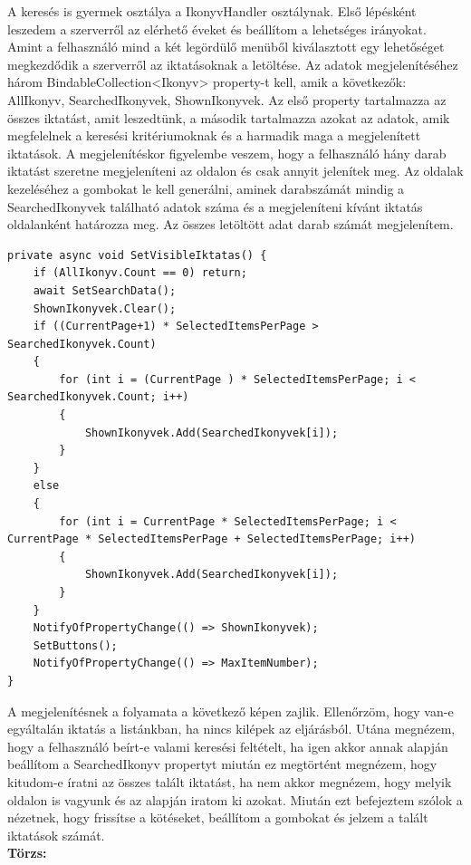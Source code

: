 \documentclass[
]{thesis-ekf}
\theoremstyle{definition}
\theoremstyle{remark}
\begin{document}
A keresés is gyermek osztálya a IkonyvHandler osztálynak. Első lépésként leszedem a szerverről az elérhető éveket és beállítom a lehetséges irányokat. Amint a felhasználó mind a két legördülő menüből kiválasztott egy lehetőséget megkezdődik a szerverről az iktatásoknak a letöltése. Az adatok megjelenítéséhez három BindableCollection<Ikonyv> property-t kell, amik a következők: AllIkonyv, SearchedIkonyvek, ShownIkonyvek. Az első property tartalmazza az összes iktatást, amit leszedtünk, a második tartalmazza azokat az adatok, amik megfelelnek a keresési kritériumoknak és a harmadik maga a megjelenített iktatások. A megjelenítéskor figyelembe veszem, hogy a felhasználó hány darab iktatást szeretne megjeleníteni az oldalon és csak annyit jelenítek meg. Az oldalak kezeléséhez a gombokat le kell generálni, aminek darabszámát mindig a SearchedIkonyvek található adatok száma és a megjeleníteni kívánt iktatás oldalanként határozza meg. Az összes letöltött adat darab számát megjelenítem.
\begin{lstlisting}[caption={Megjeleníthető iktatások a keresésben.},captionpos=b]
private async void SetVisibleIktatas() {	
	if (AllIkonyv.Count == 0) return;
	await SetSearchData();
	ShownIkonyvek.Clear();
	if ((CurrentPage+1) * SelectedItemsPerPage > SearchedIkonyvek.Count)
	{
		for (int i = (CurrentPage ) * SelectedItemsPerPage; i < SearchedIkonyvek.Count; i++)
		{
			ShownIkonyvek.Add(SearchedIkonyvek[i]);
		}
	}
	else 
	{
		for (int i = CurrentPage * SelectedItemsPerPage; i < CurrentPage * SelectedItemsPerPage + SelectedItemsPerPage; i++)
		{
			ShownIkonyvek.Add(SearchedIkonyvek[i]);
		}
	}
	NotifyOfPropertyChange(() => ShownIkonyvek);	
	SetButtons();
	NotifyOfPropertyChange(() => MaxItemNumber);
} 
\end{lstlisting}

A megjelenítésnek a folyamata a következő képen zajlik. Ellenőrzöm, hogy van-e egyáltalán iktatás a listánkban, ha nincs kilépek az eljárásból. Utána megnézem, hogy a felhasználó beírt-e valami keresési feltételt, ha igen akkor annak alapján beállítom a SearchedIkonyv propertyt miután ez megtörtént megnézem, hogy kitudom-e íratni az összes talált iktatást, ha nem akkor megnézem, hogy melyik oldalon is vagyunk és az alapján iratom ki azokat. Miután ezt befejeztem szólok a nézetnek, hogy frissítse a kötéseket, beállítom a gombokat és jelzem a talált iktatások számát.\\
\textbf{Törzs:}
\end{document}
